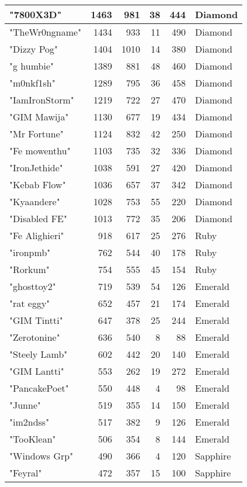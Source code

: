 \documentclass{article}
\begin{document}
\begin{table}[htbp]
\begin{tabular}{|l|r|r|r|r|l|}
"7800X3D" & 1463 & 981 & 38 & 444 & Diamond \\ \hline
"TheWr0ngname" & 1434 & 933 & 11 & 490 & Diamond \\ \hline
"Dizzy Pog" & 1404 & 1010 & 14 & 380 & Diamond \\ \hline
"g humbie" & 1389 & 881 & 48 & 460 & Diamond \\ \hline
"m0nkf1sh" & 1289 & 795 & 36 & 458 & Diamond \\ \hline
"IamIronStorm" & 1219 & 722 & 27 & 470 & Diamond \\ \hline
"GIM Mawija" & 1130 & 677 & 19 & 434 & Diamond \\ \hline
"Mr Fortune" & 1124 & 832 & 42 & 250 & Diamond \\ \hline
"Fe mowenthu" & 1103 & 735 & 32 & 336 & Diamond \\ \hline
"IronJethide" & 1038 & 591 & 27 & 420 & Diamond \\ \hline
"Kebab Flow" & 1036 & 657 & 37 & 342 & Diamond \\ \hline
"Kyaandere" & 1028 & 753 & 55 & 220 & Diamond \\ \hline
"Disabled FE" & 1013 & 772 & 35 & 206 & Diamond \\ \hline
"Fe Alighieri" & 918 & 617 & 25 & 276 & Ruby \\ \hline
"ironpmb" & 762 & 544 & 40 & 178 & Ruby \\ \hline
"Rorkum" & 754 & 555 & 45 & 154 & Ruby \\ \hline
"ghosttoy2" & 719 & 539 & 54 & 126 & Emerald \\ \hline
"rat eggy" & 652 & 457 & 21 & 174 & Emerald \\ \hline
"GIM Tintti" & 647 & 378 & 25 & 244 & Emerald \\ \hline
"Zerotonine" & 636 & 540 & 8 & 88 & Emerald \\ \hline
"Steely Lamb" & 602 & 442 & 20 & 140 & Emerald \\ \hline
"GIM Lantti" & 553 & 262 & 19 & 272 & Emerald \\ \hline
"PancakePoet" & 550 & 448 & 4 & 98 & Emerald \\ \hline
"Junne" & 519 & 355 & 14 & 150 & Emerald \\ \hline
"im2ndss" & 517 & 382 & 9 & 126 & Emerald \\ \hline
"TooKlean" & 506 & 354 & 8 & 144 & Emerald \\ \hline
"Windows Grp" & 490 & 366 & 4 & 120 & Sapphire \\ \hline
"Feyral" & 472 & 357 & 15 & 100 & Sapphire \\ \hline

\end{tabular}
\end{table}
\end{document}
